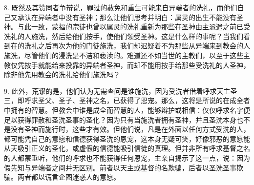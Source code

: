 8. 既然及其赞同者争辩说，罪过的赦免和重生可能来自异端者的洗礼，而他们自己又承认在异端者中没有圣神；那么让他们思考并明白：属灵的出生不能没有圣神。与此一致，蒙福的宗徒也曾以属灵的洗礼重新为那些在圣神由主派遣之前已受洗礼的人施洗，然后给他们按手，使他们领受圣神。这是什么样的事呢？当我们看到在的洗礼之后再次为他的门徒施洗，我们却迟疑着不为那些从异端来到教会的人施洗，尽管他们的浸洗是不洁和亵渎的。难道还不如当世的主教们，以至于这些主教仅凭按手就能给来投靠的异端者圣神，而却不能用按手给那些受洗礼的人圣神，除非他先用教会的洗礼给他们施洗吗？\par

9. 此外，荒谬的是，他们认为无需查问是谁施洗，因为受洗者借着呼求天主圣三，即呼求圣父、圣子、圣神之名，已获得了恩宠。那么，这将是所说的在成全者中拥有的智慧。但教会中谁是成全而智慧的人，能够辩护或相信：仅仅呼求名字便足以获得罪赦和圣洗圣事的圣化？因为只有当施洗者拥有圣神，并且圣洗本身也不是没有圣神而施行时，这些才有效。但他们说，凡是在外面以任何方式受洗的人，都可能凭自己的意愿和信德获得圣洗的恩宠，这本身无疑可笑，好像邪恶的意愿能从天吸引正义的圣化，或虚假的信德能吸引信徒的真理。但并非所有呼求基督之名的人都蒙垂听，他们的呼求也不能获得任何恩宠，主亲自揭示了这一点，说：因为假先知与异端者之间并无区别。前者以天主或基督的名欺骗，后者以圣洗圣事欺骗。两者都以谎言企图迷惑人的意愿。\par

